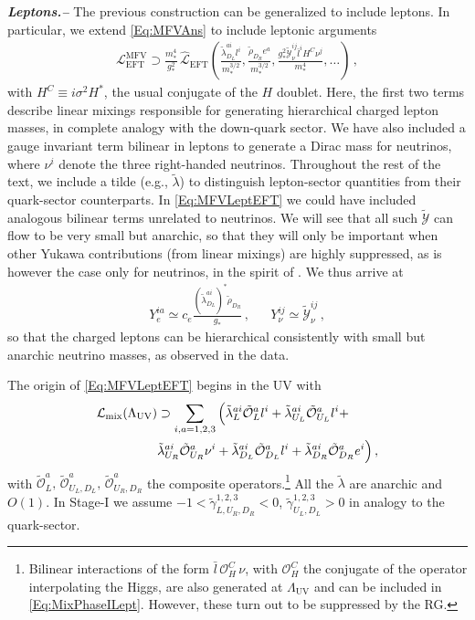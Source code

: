 \documentclass[aps,prl,twocolumn,showpacs,10pt,preprintnumbers,nofootinbib]{revtex4-2}
\newcommand{\gst}{g_*}
\newcommand{\mst}{m_*}
\newcommand{\LUV}{\Lambda_{\text{UV}}}
\newcommand{\LL}{\tilde{\lambda}}
\newcommand{\op}{\mathcal{O}}
\begin{document}
{\textbf{\textit{Leptons.--}} The previous construction can be generalized to include leptons. In particular, we extend \eqref{Eq:MFVAns} to include leptonic arguments
\begin{align}\label{Eq:MFVLeptEFT}
    \mathcal{L}_{\text{EFT}}^{\text{MFV}} \supset \frac{\mst^4}{\gst^2}\,\hat{\mathcal{L}}_{\text{EFT}}\left( \frac{\LL_{D_L}^{ai}l^i}{\mst^{3/2}},\frac{\tilde{\rho}_{D_R}e^a}{\mst^{3/2}},\frac{\gst^2\tilde{\mathcal{Y}}_{\nu}^{ij}\bar{l}^iH^C\nu^j}{\mst^4},\ldots\right)\,,
\end{align}
with $H^C \equiv i \sigma^2 H^*$, the usual conjugate of the $H$ doublet. Here, the first two terms describe linear mixings responsible for generating hierarchical charged lepton masses, in complete analogy with the down-quark sector. We have also included a gauge invariant term bilinear in leptons to generate a Dirac mass for neutrinos, where $\nu^i$ denote the three right-handed neutrinos. Throughout the rest of the text, we include a tilde (e.g., $\LL$) to distinguish lepton-sector quantities from their quark-sector counterparts. In \eqref{Eq:MFVLeptEFT} we could have included analogous bilinear terms unrelated to neutrinos. We will see that all such $\tilde{\mathcal{Y}}$ can flow to be very small but anarchic, so that they will only be important when other Yukawa contributions (from linear mixings) are highly suppressed, as is however the case only for neutrinos, in the spirit of \cite{Agashe:2008fe}. We thus arrive at 
\begin{align}\label{Eq:LeptYuk}
   Y_e^{ia} \simeq c_e \frac{(\LL^{ai}_{D_L})^* \tilde{\rho}_{D_R}}{\gst}\,,&& Y_{\nu}^{ij} \simeq \tilde{\mathcal{Y}}_{\nu}^{ij}\,,
\end{align}
so that the charged leptons can be hierarchical consistently with small but anarchic neutrino masses, as observed in the data.


The origin of \eqref{Eq:MFVLeptEFT} begins in the UV with
\begin{align}\label{Eq:MixPhaseILept}
\mathcal{L}_{\text{mix}}(\Lambda_{\text{UV}})&\supset \sum_{i,a=1,2,3} \Big( \LL_L^{ai} \tilde{\op}^a_L l^i +\LL_{U_L}^{ai} \tilde{\op}_{U_L}^a l^i +\\ &\LL_{U_R}^{ai}\tilde{\op}_{U_R}^a \nu^i + \LL_{D_L}^{ai} \tilde{\op}^{a}_{D_L} l^i+ \LL_{D_R}^{ai} \tilde{\op}^{a}_{D_R} e^i\Big)\,,\notag
\end{align}
with $\tilde{\op}_L^a,\,\tilde{\op}^a_{U_L,D_L},\,\tilde{\op}^a_{U_R,D_R}$ the composite operators.\footnote{Bilinear interactions of the form $\bar{l}\,\op_H^C\,\nu$, with $\op_H^C$ the conjugate of the operator interpolating the Higgs, are also generated at $\LUV$ and can be included in \eqref{Eq:MixPhaseILept}. However, these turn out to be suppressed by the RG.} All the $\tilde{\lambda}$ are anarchic and $O(1)$. In Stage-I we assume $-1<\tilde{\gamma}_{L,U_R, D_R}^{1,2,3}<0$, $\tilde{\gamma}_{U_L,D_L}^{1,2,3}>0$ in analogy to the quark-sector. 

}
\end{document}
